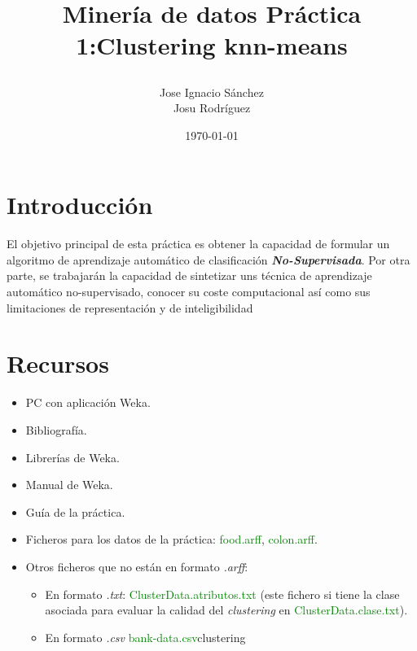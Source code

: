 \documentclass[10pt,a4paper]{article}
\author{Jose Ignacio Sánchez\\Josu Rodríguez}
\title{\begin{center}\textbf{\Huge{Minería de datos} Práctica 1:Clustering knn-means}
\end{center}}
\date{\today}
\newtheorem{defi}{(\it Definición)}[section]%
\begin{document}
\maketitle

\thispagestyle{empty}%

\newpage

\renewcommand\contentsname{\centering ÍNDICE DE CONTENIDO}
\tableofcontents%
\thispagestyle{empty}
\newpage


\renewcommand\listfigurename{\centering ÍNDICE DE FIGURAS}
\thispagestyle{empty}
\listoffigures
\clearpage

\setcounter{page}{1}%

\section{Introducción}

El objetivo principal de esta práctica es obtener la capacidad de formular un
algoritmo de aprendizaje automático de clasificación \textbf{\textit{No-Supervisada}}. 
Por otra parte, se trabajarán la capacidad de sintetizar uns técnica de aprendizaje automático
no-supervisado, conocer su coste computacional así como sus limitaciones de representación
y de inteligibilidad \par


\section{Recursos}
\begin{itemize}
	\item PC con aplicación Weka.
	\item Bibliografía.
	\item Librerías de  Weka.
	\item Manual de Weka.
	\item Guía de la práctica.
	\item Ficheros para los datos de la
	práctica:
	\textcolor{green}{food.arff},
	\textcolor{green}{colon.arff}.
	\item Otros ficheros que no están en formato \textit{.arff}:
		\begin{itemize}
			\item En formato \textit{.txt}: \textcolor{green}{ClusterData.atributos.txt} (este fichero si tiene la clase asociada para 
			evaluar la calidad del \textit{clustering} en \textcolor{green}{ClusterData.clase.txt}).
			\item En formato \textit{.csv} \textcolor{green}{bank-data.csv}clustering
		\end{itemize}
\end{itemize}
\end{document}
